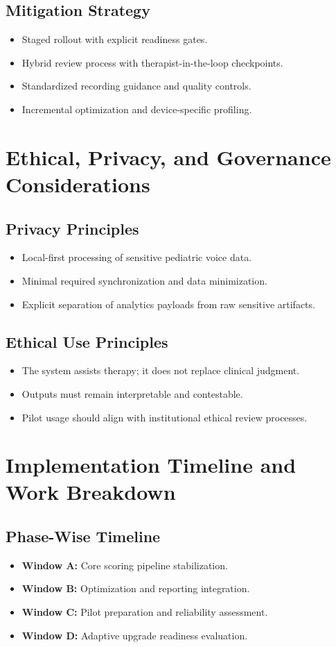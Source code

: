 \documentclass[12pt,a4paper]{article}
\begin{document}
\subsection{Mitigation Strategy}
\begin{itemize}[noitemsep,topsep=2pt]
\item Staged rollout with explicit readiness gates.
\item Hybrid review process with therapist-in-the-loop checkpoints.
\item Standardized recording guidance and quality controls.
\item Incremental optimization and device-specific profiling.
\end{itemize}

\section{Ethical, Privacy, and Governance Considerations}
\subsection{Privacy Principles}
\begin{itemize}[noitemsep,topsep=2pt]
\item Local-first processing of sensitive pediatric voice data.
\item Minimal required synchronization and data minimization.
\item Explicit separation of analytics payloads from raw sensitive artifacts.
\end{itemize}

\subsection{Ethical Use Principles}
\begin{itemize}[noitemsep,topsep=2pt]
\item The system assists therapy; it does not replace clinical judgment.
\item Outputs must remain interpretable and contestable.
\item Pilot usage should align with institutional ethical review processes.
\end{itemize}

\section{Implementation Timeline and Work Breakdown}
\subsection{Phase-Wise Timeline}
\begin{itemize}[noitemsep,topsep=2pt]
\item \textbf{Window A:} Core scoring pipeline stabilization.
\item \textbf{Window B:} Optimization and reporting integration.
\item \textbf{Window C:} Pilot preparation and reliability assessment.
\item \textbf{Window D:} Adaptive upgrade readiness evaluation.
\end{itemize}
\end{document}
